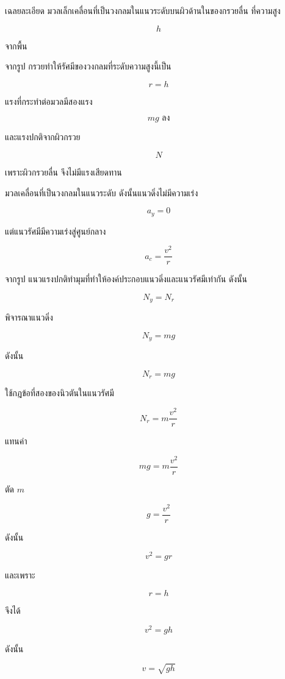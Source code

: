 \begin{examplebox}{เฉลยละเอียด}
มวลเล็กเคลื่อนที่เป็นวงกลมในแนวระดับบนผิวด้านในของกรวยลื่น ที่ความสูง

\[
h
\]

จากพื้น

จากรูป กรวยทำให้รัศมีของวงกลมที่ระดับความสูงนี้เป็น

\[
r=h
\]

แรงที่กระทำต่อมวลมีสองแรง

\[
mg \text{ ลง}
\]

และแรงปกติจากผิวกรวย

\[
N
\]

เพราะผิวกรวยลื่น จึงไม่มีแรงเสียดทาน

มวลเคลื่อนที่เป็นวงกลมในแนวระดับ ดังนั้นแนวดิ่งไม่มีความเร่ง

\[
a_y=0
\]

แต่แนวรัศมีมีความเร่งสู่ศูนย์กลาง

\[
a_c=\frac{v^2}{r}
\]

จากรูป แนวแรงปกติทำมุมที่ทำให้องค์ประกอบแนวดิ่งและแนวรัศมีเท่ากัน ดังนั้น

\[
N_y=N_r
\]

พิจารณาแนวดิ่ง

\[
N_y=mg
\]

ดังนั้น

\[
N_r=mg
\]

ใช้กฎข้อที่สองของนิวตันในแนวรัศมี

\[
N_r=m\frac{v^2}{r}
\]

แทนค่า

\[
mg=m\frac{v^2}{r}
\]

ตัด $m$

\[
g=\frac{v^2}{r}
\]

ดังนั้น

\[
v^2=gr
\]

และเพราะ

\[
r=h
\]

จึงได้

\[
v^2=gh
\]

ดังนั้น

\[
\boxed{v=\sqrt{gh}}
\]
\end{examplebox}
